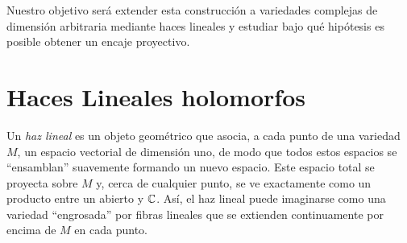 	Nuestro objetivo será extender esta construcción a variedades complejas de dimensión arbitraria mediante haces lineales y estudiar bajo qué hipótesis es posible obtener un encaje proyectivo.
	
\section{Haces Lineales holomorfos}

	
    Un \textit{haz lineal} es un objeto geométrico que asocia, a cada punto de una variedad $M$, un espacio vectorial de dimensión uno, de modo que todos estos espacios se \enquote{ensamblan} suavemente formando un nuevo espacio. Este espacio total se proyecta sobre $M$ y, cerca de cualquier punto, se ve exactamente como un producto entre un abierto y $\mathbb{C}$. Así, el haz lineal puede imaginarse como una variedad \enquote{engrosada} por fibras lineales que se extienden continuamente por encima de $M$ en cada punto.

